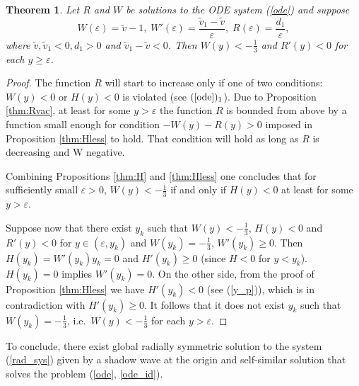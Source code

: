 \documentclass[reqno]{article}%
\theoremstyle{plain}
\newtheorem{theorem}{Theorem}[section]
\theoremstyle{definition}
\theoremstyle{remark}
\numberwithin{equation}{section}
\begin{document}
 
\begin{theorem}\label{thm:main_anl}
Let $R$ and $W$ be solutions to the ODE system (\ref{ode}) and suppose
\begin{equation}\label{id_collapse}
W(\varepsilon)=\tilde{v}-1,\; W'(\varepsilon)=\frac{\tilde{v}_1-\tilde{v}}{\varepsilon},\; R(\varepsilon)=\frac{d_1}{\varepsilon},
\end{equation}
where 
$ \tilde{v},\tilde{v}_1<0,d_1>0$ and $\tilde{v}_1-\tilde{v}<0$. Then $W(y)<-\frac{1}{3}$ and $R'(y)<0$ for each $y\geq \varepsilon$.
\end{theorem}
\begin{proof}
The function $R$ will start to increase only if one of two conditions: $W(y)<0$ or $H(y)<0$ is violated (see $(\ref{ode})_1$). 
	Due to Proposition \ref{thm:Rvac}, at least for some $y>\varepsilon$ the function
	$R$ is bounded from above by a function small enough for  condition $-W(y)-R(y)>0$ imposed in Proposition \ref{thm:Hless} to hold. That condition will hold as long as $R$ is decreasing and W negative.  
	
	Combining Propositions \ref{thm:H} and \ref{thm:Hless} one concludes that for sufficiently small $\varepsilon >0$, $W(y)< -\frac{1}{3}$ if and only if $H(y)<0$ at least for some $y>\varepsilon$.
	 
	Suppose now that there exist $y_k$ such that $W(y)<-\frac{1}{3}$, $H(y)<0$ and $R'(y)<0$ for $y\in(\varepsilon,y_k)$ and  $W(y_k)=-\frac{1}{3}$, $W'(y_k)\geq 0$. 
	Then $H(y_k)=W'(y_k)y_k=0$ and $H'(y_k)\geq 0$ (since $H<0$ for $y<y_k$). $H(y_k)=0$ implies $W'(y_k)=0.$ On the other side, from the proof of Proposition \ref{thm:Hless} we have $H'(y_k)<0$ (see (\ref{y_p})), which is in contradiction with $H'(y_k)\geq 0$. It follows that it does not exist $y_k$ such that $W(y_k)=-\frac{1}{3}$, i.e.\
	$W(y)<-\frac{1}{3}$ for each $y>\varepsilon.$
	
\end{proof}
\medskip

 
To conclude, there exist global radially symmetric  solution to the system (\ref{rad_sys}) given by a shadow wave at the origin  and self-similar solution that solves the problem (\ref{ode}, \ref{ode_id}).
\end{document}
